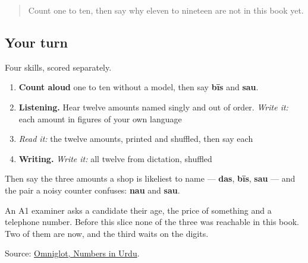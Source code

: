 \label{lesson:UR-C30-practice}



\begin{quote}
Count one to ten, then say why eleven to nineteen are not in this book yet.
\end{quote}

\subsection*{Your turn}
Four skills, scored separately.

\begin{enumerate}
\raggedright
  \item \textbf{Count aloud} one to ten without a model, then say \textbf{bīs} and \textbf{sau}.
  \item \textbf{Listening.} Hear twelve amounts named singly and out of order. \emph{Write it:} each amount in figures of your own language
  \item \emph{Read it:} the twelve amounts, printed and shuffled, then say each
  \item \textbf{Writing.} \emph{Write it:} all twelve from dictation, shuffled
\end{enumerate}

Then say the three amounts a shop is likeliest to name — \textbf{das}, \textbf{bīs}, \textbf{sau} — and the pair a noisy counter confuses: \textbf{nau} and \textbf{sau}.

An A1 examiner asks a candidate their age, the price of something and a telephone number. Before this slice none of the three was reachable in this book. Two of them are now, and the third waits on the digits.

\begin{tcolorbox}[breakable,colback=teal!4,colframe=teal!35!black,title={Before you move on}]
Source: \href{https://www.omniglot.com/language/numbers/urdu.htm}{Omniglot, Numbers in Urdu}.
\end{tcolorbox}
